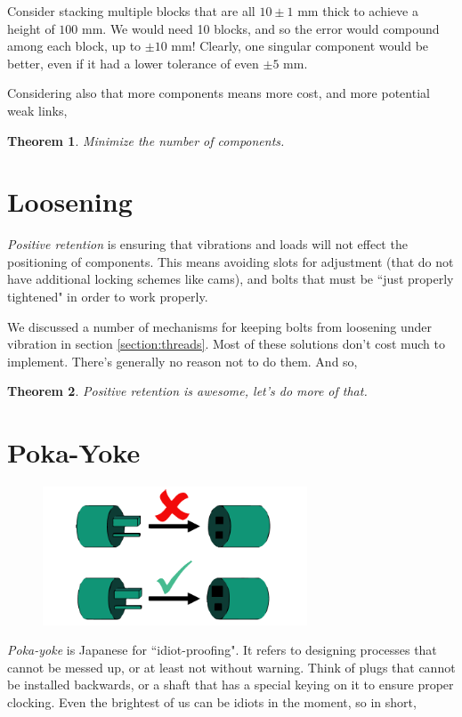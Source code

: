 \documentclass[10pt,letterpaper]{book}
\newtheorem{theorem}{Theorem}
\begin{document}
Consider stacking multiple blocks that are all $10 \pm 1$ mm thick to achieve a height of $100$ mm. We would need 10 blocks, and so the error would compound among each block, up to $\pm 10$ mm! Clearly, one singular component would be better, even if it had a lower tolerance of even $\pm 5$ mm.

Considering also that more components means more cost, and more potential weak links,

\begin{theorem}
Minimize the number of components.
\end{theorem}

\section{Loosening}

\textit{Positive retention} is ensuring that vibrations and loads will not effect the positioning of components. This means avoiding slots for adjustment (that do not have additional locking schemes like cams), and bolts that must be ``just properly tightened" in order to work properly.

We discussed a number of mechanisms for keeping bolts from loosening under vibration in section \ref{section:threads}. Most of these solutions don't cost much to implement. There's generally no reason not to do them. And so,

\begin{theorem}
Positive retention is awesome, let's do more of that.
\end{theorem}

\section{Poka-Yoke}

\begin{figure}[H]
	\includegraphics[width=0.7\textwidth]{imgs/poka_yoke.png}
\end{figure}

\textit{Poka-yoke} is Japanese for ``idiot-proofing". It refers to designing processes that cannot be messed up, or at least not without warning. Think of plugs that cannot be installed backwards, or a shaft that has a special keying on it to ensure proper clocking. Even the brightest of us can be idiots in the moment, so in short,
\end{document}
